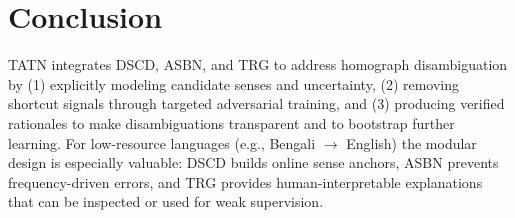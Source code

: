 \documentclass[11pt]{article}
\begin{document}
\section{Conclusion}
TATN integrates DSCD, ASBN, and TRG to address homograph disambiguation by (1) explicitly modeling candidate senses and uncertainty, (2) removing shortcut signals through targeted adversarial training, and (3) producing verified rationales to make disambiguations transparent and to bootstrap further learning. For low-resource languages (e.g., Bengali $\rightarrow$ English) the modular design is especially valuable: DSCD builds online sense anchors, ASBN prevents frequency-driven errors, and TRG provides human-interpretable explanations that can be inspected or used for weak supervision.
\end{document}
